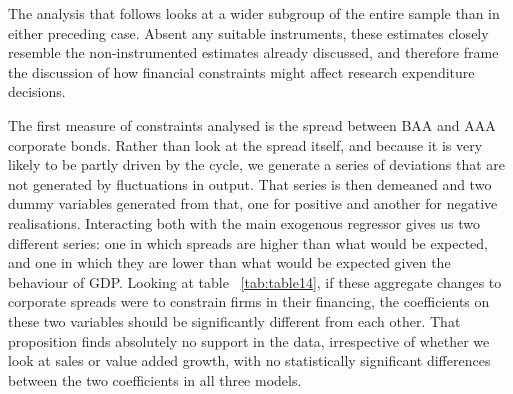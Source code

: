 \documentclass{_latex/house}
\begin{document}
The analysis that follows looks at a wider subgroup of the entire sample than in either preceding case. Absent any suitable instruments, these estimates closely resemble the non-instrumented estimates already discussed, and therefore frame the discussion of how financial constraints might affect research expenditure decisions.

The first measure of constraints analysed is the spread between BAA and AAA corporate bonds. Rather than look at the spread itself, and because it is very likely to be partly driven by the cycle, we generate a series of deviations that are not generated by fluctuations in output. That series is then demeaned and two dummy variables generated from that, one for positive and another for negative realisations. Interacting both with the main exogenous regressor gives us two different series: one in which spreads are higher than what would be expected, and one in which they are lower than what would be expected given the behaviour of GDP. Looking at table ~\ref{tab:table14}, if these aggregate changes to corporate spreads were to constrain firms in their financing, the coefficients on these two variables should be significantly different from each other. That proposition finds absolutely no support in the data, irrespective of whether we look at sales or value added growth, with no statistically significant differences between the two coefficients in all three models.
\end{document}
